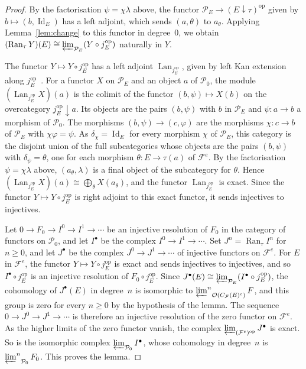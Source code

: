 \documentclass[10pt]{amsart}
\theoremstyle{definition}
\numberwithin{equation}{section}
\renewcommand{\ge}{\geqslant}
\newcommand{\F}{\mathcal F}
\newcommand{\Op}{\mathcal O}
\newcommand{\limi}[2]{\mathop{\varprojlim\nolimits^{#1}}_{#2}}
\begin{document}
\begin{proof}
By the factorisation $\psi=\chi\lambda$ above, the functor ${\mathcal P_E\to(E\downarrow\tau)^{\mathrm{op}}}$ given by $b\mapsto(b,\operatorname{Id}_E)$ has a left adjoint, which sends $(a,\theta)$ to $a_\theta$. Applying Lemma~\ref{lem:change} to this functor in degree~$0$, we obtain $(\operatorname{Ran}_\tau Y)(E)\cong\varprojlim_{\mathcal P_E}(Y\circ j_E^{\mathrm{op}})$ naturally in $Y$.

The functor $Y\mapsto Y\circ j_E^{\mathrm{op}}$ has a left adjoint $\operatorname{Lan}_{j_E^{\mathrm{op}}}$, given by left Kan extension along $j_E^{\mathrm{op}}$~\cite[X.3, formulas~(9) and~(10)]{MacLane}. For a functor $X$ on $\mathcal P_E$ and an object $a$ of $\mathcal P_0$, the module $(\operatorname{Lan}_{j_E^{\mathrm{op}}}X)(a)$ is the colimit of the functor $(b,\psi)\mapsto X(b)$ on the overcategory $j_E^{\mathrm{op}}\downarrow a$. Its objects are the pairs $(b,\psi)$ with $b$ in $\mathcal P_E$ and $\psi\colon a\to b$ a morphism of $\mathcal P_0$. The morphisms $(b,\psi)\to(c,\varphi)$ are the morphisms $\chi\colon c\to b$ of $\mathcal P_E$ with $\chi\varphi=\psi$. As $\delta_\chi=\operatorname{Id}_E$ for every morphism $\chi$ of $\mathcal P_E$, this category is the disjoint union of the full subcategories whose objects are the pairs $(b,\psi)$ with $\delta_\psi=\theta$, one for each morphism $\theta\colon E\to\tau(a)$ of $\F^e$. By the factorisation $\psi=\chi\lambda$ above, $(a_\theta,\lambda)$ is a final object of the subcategory for $\theta$. Hence $(\operatorname{Lan}_{j_E^{\mathrm{op}}}X)(a)\cong\bigoplus_\theta X(a_\theta)$, and the functor $\operatorname{Lan}_{j_E^{\mathrm{op}}}$ is exact. Since the functor $Y\mapsto Y\circ j_E^{\mathrm{op}}$ is right adjoint to this exact functor, it sends injectives to injectives.

Let $0\to F_0\to I^0\to I^1\to\cdots$ be an injective resolution of $F_0$ in the category of functors on $\mathcal P_0$, and let $I^\bullet$ be the complex $I^0\to I^1\to\cdots$. Set $J^n=\operatorname{Ran}_\tau I^n$ for $n\ge0$, and let $J^\bullet$ be the complex $J^0\to J^1\to\cdots$ of injective functors on $\F^e$. For $E$ in $\F^e$, the functor $Y\mapsto Y\circ j_E^{\mathrm{op}}$ is exact and sends injectives to injectives, and so $I^\bullet\circ j_E^{\mathrm{op}}$ is an injective resolution of $F_0\circ j_E^{\mathrm{op}}$. Since $J^\bullet(E)\cong\varprojlim_{\mathcal P_E}(I^\bullet\circ j_E^{\mathrm{op}})$, the cohomology of $J^\bullet(E)$ in degree~$n$ is isomorphic to $\limi{n}{\Op(C_\F(E)^c)}F$, and this group is zero for every $n\ge0$ by the hypothesis of the lemma. The sequence $0\to J^0\to J^1\to\cdots$ is therefore an injective resolution of the zero functor on $\F^e$. As the higher limits of the zero functor vanish, the complex $\varprojlim_{(\F^e)^{\mathrm{op}}}J^\bullet$ is exact. So is the isomorphic complex $\varprojlim_{\mathcal P_0}I^\bullet$, whose cohomology in degree~$n$ is $\limi{n}{\mathcal P_0}F_0$. This proves the lemma.
\end{proof}
\end{document}
